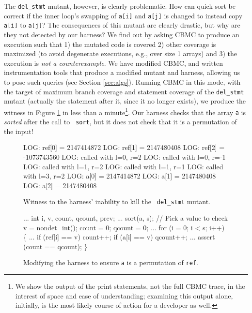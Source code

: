 \documentclass[conference]{IEEEtran}
\begin{document}
The {\tt del\_stmt} mutant, however, is clearly problematic.  How can
quick sort be correct if the inner loop's swapping of {\tt a[i]} and
{\tt a[j]} is changed to instead copy {\tt a[i]} to {\tt a[j]}?  The
consequences of this mutant are clearly drastic, but why are they not
detected by our harness?  We find out by asking CBMC to produce an
execution such that 1) the mutated code is covered 2) other coverage
is maximized (to avoid degenerate executions, e.g., over size 1
arrays) and 3) the execution is \emph{not a counterexample}.  We have
modified CBMC, and written instrumentation tools that produce a
modified mutant and harness, allowing us to pose such queries (see
Section \ref{sec:algs}).  Running CBMC in this mode, with the target of maximum branch
coverage and statement coverage of the {\tt del\_stmt} mutant
(actually the statement after it, since it no longer exists),
we produce the witness in Figure \ref{fig:witness1} in less
than a minute\footnote{We show the output of the print statements, not
  the full CBMC trace, in the interest of space and ease of
  understanding; examining this output alone, initially, is the most
  likely course of action for a developer as well.}.  Our harness
checks that the array {\tt a} is \emph{sorted} after the call to {\tt
  sort}, but it does not check that it is a permutation of the input!

\begin{figure}
{\scriptsize
\begin{code}
LOG: ref[0] = 2147414872
LOG: ref[1] = 2147480408
LOG: ref[2] = -1073743560
LOG: called with l=0, r=2
LOG: called with l=0, r=-1
LOG: called with l=1, r=2
LOG: called with l=1, r=1
LOG: called with l=3, r=2
LOG: a[0] = 2147414872
LOG: a[1] = 2147480408
LOG: a[2] = 2147480408
\end{code}
}
\caption{Witness to the harness' inability to kill the {\tt
    del\_stmt} mutant.}
\label{fig:witness1}
\end{figure}

\begin{figure}
{\scriptsize
\begin{code}
...
   int i, v, count, qcount, prev;
...
  sort(a, s);
  // Pick a value to check
  v = nondet\_int();
  count = 0;
  qcount = 0;
...
  for (i = 0; i < s; i++) \{
...
     if (ref[i] == v) 
       count++;
     if (a[i] == v) 
       qcount++;
...
   assert (count == qcount);
\}
\end{code}
}
\caption{Modifying the harness to ensure {\tt a} is a permutation of
  {\tt ref}.}
\label{fig:added}
\end{figure}
\end{document}
